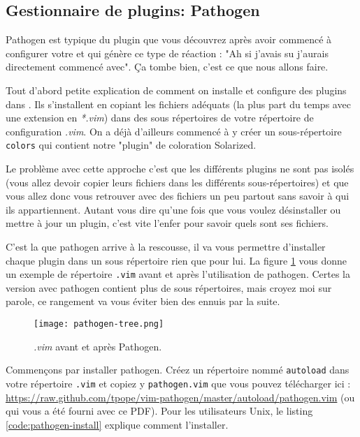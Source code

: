 \subsection{Gestionnaire de plugins: Pathogen}

Pathogen est typique du plugin que vous découvrez après avoir commencé à configurer votre \vim et qui génère ce type de réaction : "Ah si j'avais su j'aurais directement commencé avec". Ça tombe bien, c'est ce que nous allons faire.

Tout d'abord petite explication de comment on installe et configure des plugins dans \vim. Ils s'installent en copiant les fichiers adéquats (la plus part du temps avec une extension en \emph{*.vim}) dans des sous répertoires de votre répertoire de configuration \emph{.vim}. On a déjà d'ailleurs commencé à y créer un sous-répertoire \Verb|colors| qui contient notre "plugin" de coloration Solarized.

Le problème avec cette approche c'est que les différents plugins ne sont pas isolés (vous allez devoir copier leurs fichiers dans les différents sous-répertoires) et que vous allez donc vous retrouver avec des fichiers un peu partout sans savoir à qui ils appartiennent. Autant vous dire qu'une fois que vous voulez désinstaller ou mettre à jour un plugin, c'est vite l'enfer pour savoir quels sont ses fichiers.

C'est la que pathogen arrive à la rescousse, il va vous permettre d'installer chaque plugin dans un sous répertoire rien que pour lui. La figure \ref{fig:pathogen-tree} vous donne un exemple de répertoire \Verb|.vim| avant et après l'utilisation de pathogen. Certes la version avec pathogen contient plus de sous répertoires, mais croyez moi sur parole, ce rangement va vous éviter bien des ennuis par la suite.

\begin{figure}%
  \texttt{[image: pathogen-tree.png]}
  \caption{\emph{.vim} avant et après Pathogen.}
  \label{fig:pathogen-tree}
\end{figure}

Commençons par installer pathogen. Créez un répertoire nommé \Verb|autoload| dans votre répertoire \Verb|.vim| et copiez y \Verb|pathogen.vim| que vous pouvez télécharger ici : \url{https://raw.github.com/tpope/vim-pathogen/master/autoload/pathogen.vim} (ou qui vous a été fourni avec ce PDF). Pour les utilisateurs Unix, le listing \ref{code:pathogen-install} explique comment l'installer.

